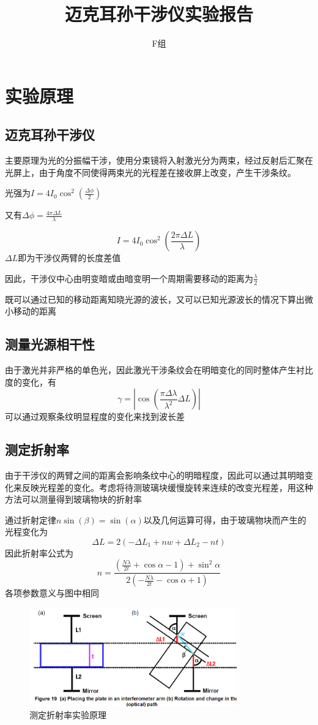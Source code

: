 \documentclass[10pt]{ctexart}
\title{迈克耳孙干涉仪实验报告}
\author{F组}
\begin{document}
\maketitle
\section{实验原理}
\subsection{迈克耳孙干涉仪}
主要原理为光的分振幅干涉，使用分束镜将入射激光分为两束，经过反射后汇聚在光屏上，由于角度不同使得两束光的光程差在接收屏上改变，产生干涉条纹。

光强为$I=4I_0\cos^2(\frac{\Delta\phi}{2})$

又有$\Delta\phi=\frac{4\pi\Delta L}{\lambda}$

\[I=4I_0\cos^2(\frac{2\pi\Delta L}{\lambda})\]
$\Delta L$即为干涉仪两臂的长度差值

因此，干涉仪中心由明变暗或由暗变明一个周期需要移动的距离为$\frac{\lambda}{2}$

既可以通过已知的移动距离知晓光源的波长，又可以已知光源波长的情况下算出微小移动的距离
\subsection{测量光源相干性}
由于激光并非严格的单色光，因此激光干涉条纹会在明暗变化的同时整体产生衬比度的变化，有
\[\gamma=|\cos(\frac{\pi\Delta\lambda}{\lambda^2}\Delta L)|\]
可以通过观察条纹明显程度的变化来找到波长差
\subsection{测定折射率}
由于干涉仪的两臂之间的距离会影响条纹中心的明暗程度，因此可以通过其明暗变化来反映光程差的变化。考虑将待测玻璃块缓慢旋转来连续的改变光程差，用这种方法可以测量得到玻璃物块的折射率

通过折射定律$n\sin(\beta)=\sin(\alpha)$以及几何运算可得，由于玻璃物块而产生的光程变化为
\[\Delta L = 2(-\Delta L_1+nw+\Delta L_2 -nt)\]
因此折射率公式为
\[n=\frac{(\frac{N\lambda}{2t}+\cos\alpha-1)+\sin^2\alpha}{2(-\frac{N\lambda}{2t}-\cos\alpha+1)}\]
各项参数意义与图中相同
\begin{figure}
    \includegraphics[width=0.8\textwidth]{折射率测定.png} 
    \caption{测定折射率实验原理}
\end{figure}
\end{document}
